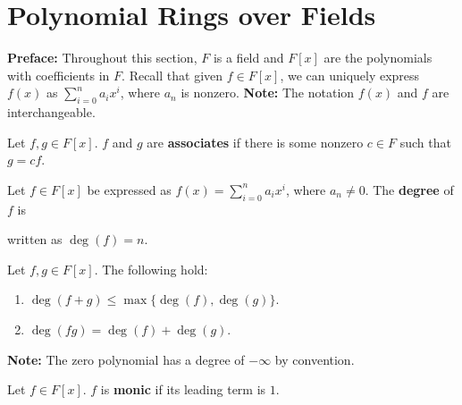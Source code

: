 \documentclass [12pt] {article}
\newenvironment{definition}[1]{\begin{tcolorbox}[title={Definition: #1},colback=blue!5!white,colframe=black!75!blue]}{\end{tcolorbox}}
\renewcommand{\bf}[1]{\textbf{{#1}}}
\begin{document}
\newpage
\section{Polynomial Rings over Fields}
\bf{Preface:} Throughout this section, $F$ is a field and $F[x]$ are the polynomials with
coefficients in $F$. Recall that given $f \in F[x]$, we can uniquely express $f(x)$ as
$\sum\limits_{i = 0}^{n} a_i x^i$, where $a_n$ is nonzero.
\newline
\bf{Note:} The notation $f(x)$ and $f$ are interchangeable.

\begin{definition}{Associate}
    Let $f, g \in F[x]$. $f$ and $g$ are \bf{associates} if there is some nonzero $c \in F$ such
    that $g = cf$.
\end{definition}

\begin{definition}{Degree}
    Let $f \in F[x]$ be expressed as $f(x) = \sum\limits_{i = 0}^{n} a_i x^i$, where $a_n \neq 0$.
    The \bf{degree} of $f$ is \vspace{-0.5em}

    written as $\deg(f) = n$.
    \vspace{0.5em}

    Let $f, g \in F[x]$. The following hold:
    \begin{enumerate}[label=(\arabic*)]
        \item $\deg(f + g) \leq \max\{ \deg(f), \deg(g) \}$.
        \item $\deg(fg) = \deg(f) + \deg(g)$.
    \end{enumerate}
    \bf{Note:} The zero polynomial has a degree of $-\infty$ by convention.
\end{definition}

\begin{definition}{Monic Polynomial}
    Let $f \in F[x]$. $f$ is \bf{monic} if its leading term is $1$.
\end{definition}
\end{document}
